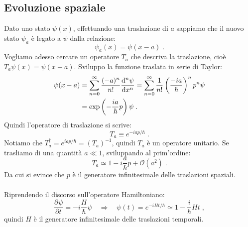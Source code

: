 \documentclass[10pt,a4paper]{report}
\theoremstyle{definition}
\newcommand{\pdev}[3][]{\frac{\partial^{#1} #2}{\partial #3^{#1}}}
\newcommand{\dev}[3][]{\frac{\mathrm{d}^{#1} #2}{\mathrm{d} #3^{#1}}}
\numberwithin{equation}{section}
\begin{document}
\subsection{Evoluzione spaziale}
Dato uno stato $\psi(x)$, effettuando una traslazione di $a$ sappiamo che il nuovo stato $\psi_a$ è legato a $\psi$ dalla relazione:
$$
\psi_a(x)=\psi(x-a)\;.
$$
Vogliamo adesso cercare un operatore $T_a$ che descriva la traslazione, cioè $T_a\psi(x)=\psi(x-a)$. Sviluppo la funzione traslata in serie di Taylor:
\begin{align}
\psi(x-a)&=\sum_{n=0}^{\infty} \frac{(-a)^n}{n!}\dev[n]{\psi}{x}=\sum_{n=0}^{\infty}\frac{1}{n!}\left(\frac{-ia}{\hbar}\right)^np^n\psi \notag \\
&=\exp\left(-\frac{ia}{\hbar}p\right)\psi\;.
\end{align}
Quindi l'operatore di traslazione si scrive:
\begin{equation}
T_a\equiv e^{-iap/\hbar}\;.
\end{equation}
Notiamo che $T_a^{\dagger}=e^{iap/\hbar}=(T_a)^{-1}$, quindi $T_a$ è un operatore unitario. Se trasliamo di una quantità $a\ll 1$, sviluppando al prim'ordine:
\begin{equation}
T_a\simeq 1-i\frac{a}{\hbar}p+\mathcal{O}(a^2)\;.
\end{equation}
Da cui si evince che $p$ è il generatore infinitesimale delle traslazioni spaziali. \\
\\
Riprendendo il discorso sull'operatore Hamiltoniano:
$$
\pdev{\psi}{t}=-i\frac{H}{\hbar}\psi\quad \Longrightarrow \quad \psi(t)=e^{-iH t/\hbar}\simeq 1-\frac{i}{\hbar}H t\;,
$$
quindi $H$ è il generatore infinitesimale delle traslazioni temporali.
\end{document}
